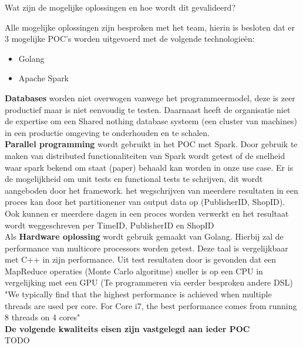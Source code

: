 Wat zijn de mogelijke oplossingen en hoe wordt dit gevalideerd?

Alle mogelijke oplossingen zijn besproken met het team, hierin is besloten dat er 3 mogelijke POC's worden uitgevoerd met de volgende technologieën:

\begin{itemize}
    \item Golang
    \item Apache Spark
\end{itemize}

\textbf{Databases} worden niet overwogen vanwege het programmeermodel, deze is zeer productief maar is niet eenvoudig te testen. Daarnaast heeft de organisatie niet de expertise om een Shared nothing database systeem (een cluster van machines) in een productie omgeving te onderhouden en te schalen. \\

\textbf{Parallel programming} wordt gebruikt in het POC met Spark. Door gebruik te maken van distributed functionaliteiten van Spark wordt getest of de snelheid waar spark bekend om staat (paper) behaald kan worden in onze use case. Er is de mogelijkheid om unit tests en functional tests te schrijven, dit wordt aangeboden door het framework.
het wegschrijven van meerdere resultaten in een proces kan door het partitionener van output data op (PublisherID, ShopID). Ook kunnen er meerdere dagen in een proces worden verwerkt en het resultaat wordt weggeschreven per TimeID, PublisherID en ShopID
\\

Als \textbf{Hardware oplossing} wordt gebruik gemaakt van Golang. Hierbij zal de performance van multicore processors worden getest. Deze taal is vergelijkbaar met C++ in zijn performance. Uit test resultaten door \cite{lee2010debunking} is gevonden dat een MapReduce operaties (Monte Carlo algoritme) sneller is op een CPU in vergelijking met een GPU (Te programmeren via eerder besproken andere DSL) "We typically find that the highest performance is achieved when multiple threads are used per core. For Core i7, the best performance comes from running 8 threads on 4 cores" \parencite{lee2010debunking} \\

\textbf{De volgende kwaliteits eisen zijn vastgelegd aan ieder POC} \\

TODO



